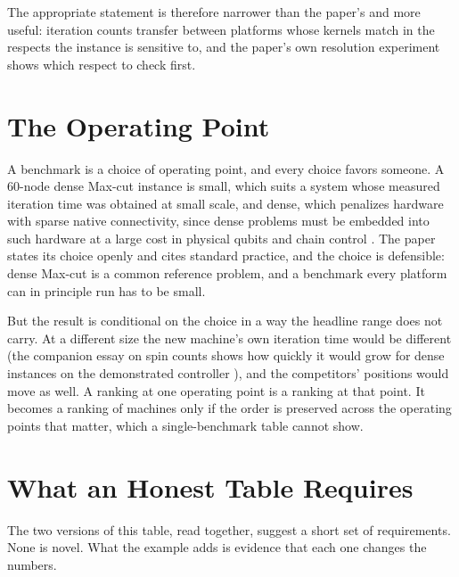 \documentclass[11pt]{article}
\theoremstyle{definition}
\theoremstyle{remark}
\begin{document}
The appropriate statement is therefore narrower than the paper's and more useful: iteration counts transfer between platforms whose kernels match in the respects the instance is sensitive to, and the paper's own resolution experiment shows which respect to check first.

\section{The Operating Point}

A benchmark is a choice of operating point, and every choice favors someone. A 60-node dense Max-cut instance is small, which suits a system whose measured iteration time was obtained at small scale, and dense, which penalizes hardware with sparse native connectivity, since dense problems must be embedded into such hardware at a large cost in physical qubits and chain control \cite{hamerly2019}. The paper states its choice openly and cites standard practice, and the choice is defensible: dense Max-cut is a common reference problem, and a benchmark every platform can in principle run has to be small.

But the result is conditional on the choice in a way the headline range does not carry. At a different size the new machine's own iteration time would be different (the companion essay on spin counts shows how quickly it would grow for dense instances on the demonstrated controller \cite{flyxion-spincount}), and the competitors' positions would move as well. A ranking at one operating point is a ranking at that point. It becomes a ranking of machines only if the order is preserved across the operating points that matter, which a single-benchmark table cannot show.

\section{What an Honest Table Requires}

The two versions of this table, read together, suggest a short set of requirements. None is novel. What the example adds is evidence that each one changes the numbers.
\end{document}
